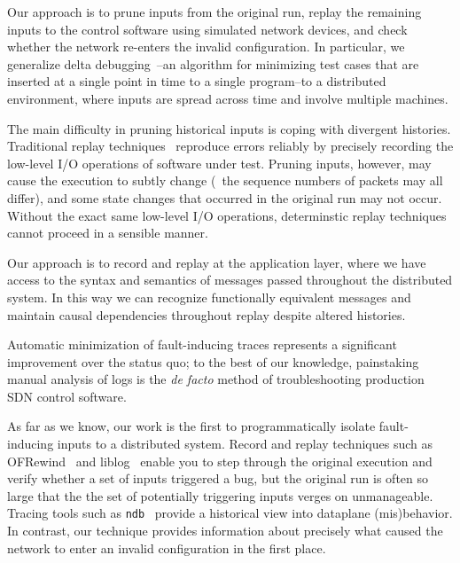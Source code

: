 Our approach is to prune inputs from the original run, replay the remaining
inputs to the control software using simulated network devices, and
check whether the network re-enters the invalid configuration.
In particular, we generalize delta debugging~\cite{Zeller:2002:SIF:506201.506206}--an algorithm for
minimizing test cases that are inserted at a single
point in time to a single program--to a distributed environment, where inputs
are spread across time and involve multiple machines. 

The main difficulty in pruning historical inputs is
coping with divergent histories. Traditional replay
techniques~\cite{Dunlap:2002:REI:844128.844148,Geels:2006:RDD:1267359.1267386}
reproduce errors reliably by precisely recording the low-level I/O operations of
software under test. Pruning inputs, however, may cause the execution to
subtly change (\eg~the sequence numbers of packets may all differ), and some
state changes that occurred in the original
run may not occur. Without the exact same low-level I/O operations,
determinstic replay techniques cannot proceed in a sensible manner.

Our approach is to record and replay at the application layer,
where we have access to the syntax and semantics of messages passed
throughout the distributed system. In this way we can recognize functionally
equivalent messages and maintain causal dependencies throughout replay despite
altered histories.

Automatic minimization of fault-inducing traces
represents a significant improvement over the status quo;
to the best of our knowledge, painstaking manual analysis of logs is the
{\em de facto} method of troubleshooting production SDN control software.

As far as we know, our work
is the first to programmatically isolate fault-inducing inputs to a distributed
system. Record and replay techniques such as
OFRewind~\cite{ofrewind} and liblog~\cite{Geels:2006:RDD:1267359.1267386}
enable you to step through the original execution and verify whether a
set of inputs triggered a bug,
but the original run is often so large that the
the set of potentially triggering inputs verges on unmanageable.
Tracing tools such as {\tt ndb}~\cite{handigol2012debugger} provide
a historical view into dataplane (mis)behavior. In contrast, our technique provides
information about precisely what caused the network to
enter an invalid configuration in the first place.


